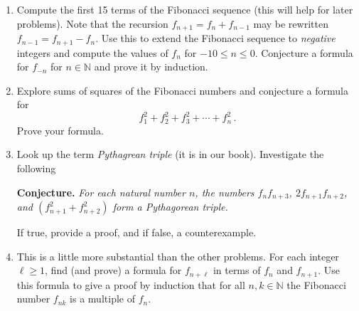 \documentclass[12pt]{article}
\newcommand{\NN}{{\mathbb N}}  %
\newcommand{\demph}[1]{{\color{blue}\sl{#1}}}
\begin{document}
\begin{enumerate}  %

\item  Compute the first 15 terms of the Fibonacci sequence (this will help for later problems).
           Note that the recursion $f_{n+1}=f_{n}+f_{n-1}$ may be rewritten $f_{n-1}=f_{n+1}-f_n$.
           Use this to extend the Fibonacci sequence to {\sl negative} integers and compute the values of $f_n$ for
           $-10\leq n \leq 0$.
           Conjecture a formula for $f_{-n}$ for $n\in\NN$ and prove it by induction.


\item Explore sums of squares of the Fibonacci numbers and conjecture a formula for 
  \[
       f_1^2 + f_2^2 + f_3^2 + \dotsb + f_n^2\,.
  \]
  Prove your formula.


\item Look up the term \demph{Pythagrean triple} (it is in our book).
    Investigate the following\medskip

  {\bf Conjecture.}  {\sl For each natural number $n$, the numbers $f_nf_{n+3}$,
  $2f_{n+1}f_{n+2}$, and $(f_{n+1}^2+f_{n+2}^2)$ form a {\color{Blue}Pythagorean triple}.}\medskip

   If true, provide a proof, and if false, a counterexample.


 \item  {\color{blue}This is a little more substantial than the other problems.}
   For each integer $\ell\geq 1$, find (and prove) a formula for $f_{n+\ell}$ in terms of $f_n$ and $f_{n+1}$.
          Use this formula to give a proof by induction that for all $n,k\in\NN$ the
          Fibonacci number $f_{nk}$ is a multiple of $f_n$.


\end{enumerate}
\end{document}
